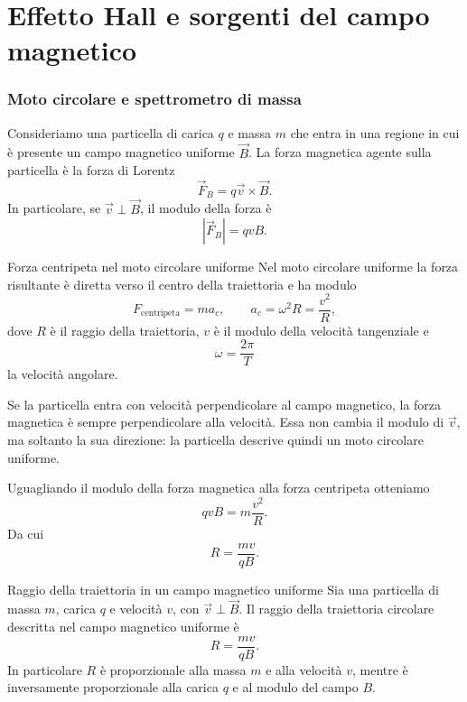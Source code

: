 \documentclass[a4paper]{article}
\begin{document}
\pagebreak
\part{Effetto Hall e sorgenti del campo magnetico}

\section{Moto circolare e spettrometro di massa}

Consideriamo una particella di carica \(q\) e massa \(m\) che entra in una regione in cui è presente un campo magnetico uniforme \(\vec{B}\). La forza magnetica agente sulla particella è la forza di Lorentz
\[
    \vec{F}_B = q\vec{v}\times\vec{B}.
\]
In particolare, se \(\vec{v}\perp\vec{B}\), il modulo della forza è
\[
    \left|\vec{F}_B\right| = qvB.
\]

\begin{snippetdefinition}{Forza centripeta nel moto circolare uniforme}
    Nel moto circolare uniforme la forza risultante è diretta verso il centro della traiettoria e ha modulo
    \[
        F_{\text{centripeta}} = ma_c,
        \qquad
        a_c = \omega^2R = \frac{v^2}{R},
    \]
    dove \(R\) è il raggio della traiettoria, \(v\) è il modulo della velocità tangenziale e
    \[
        \omega = \frac{2\pi}{T}
    \]
    la velocità angolare.
\end{snippetdefinition}

Se la particella entra con velocità perpendicolare al campo magnetico, la forza magnetica è sempre perpendicolare alla velocità. Essa non cambia il modulo di \(\vec{v}\), ma soltanto la sua direzione: la particella descrive quindi un moto circolare uniforme.

Uguagliando il modulo della forza magnetica alla forza centripeta otteniamo
\[
    qvB = m\frac{v^2}{R}.
\]
Da cui
\[
    R = \frac{mv}{qB}.
\]

\begin{snippetproposition}{Raggio della traiettoria in un campo magnetico uniforme}
    Sia una particella di massa \(m\), carica \(q\) e velocità \(v\), con \(\vec{v}\perp\vec{B}\). Il raggio della traiettoria circolare descritta nel campo magnetico uniforme è
    \[
        R = \frac{mv}{qB}.
    \]
    In particolare \(R\) è proporzionale alla massa \(m\) e alla velocità \(v\), mentre è inversamente proporzionale alla carica \(q\) e al modulo del campo \(B\).
\end{snippetproposition}
\end{document}
